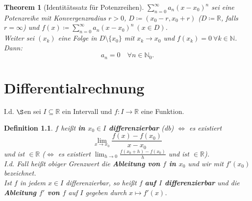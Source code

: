 \documentclass{extreport}
\newcommand{\N}{\mathbb{N}}
\newcommand{\R}{\mathbb{R}}
\theoremstyle{named}
\newtheorem{namedtheorem}{Theorem} \counterwithin{namedtheorem}{chapter}
\theoremstyle{dotless}
\newtheorem*{definition}{Definition}
\begin{document}
\begin{namedtheorem}[Identitätssatz für Potenzreihen] \label{8.4:prop-IdentitätssatzFürPotenzreihe}
	$\sum_{n=0}^{\infty} a_{n} (x - x_{0})^{n}$ sei eine Potenzreihe mit Konvergenzradius $r > 0$, $D \coloneqq (x_{0} - r, x_{0} + r)$ ($D \coloneqq \R$, falls $r = \infty$) und $f(x) \coloneqq \sum_{n=0}^{\infty} a_{n} (x - x_{0})^{n} ~(x \in D)$. \\
	Weiter sei $(x_{k})$ eine Folge in $D \setminus \{ x_{0} \}$ mit $x_{k} \rightarrow x_{0}$ und $f(x_{k}) = 0 ~\forall k \in \N$. Dann:
	$$ a_{n} = 0 \quad \forall n \in \N_{0}. $$ 
\end{namedtheorem}


\newpage


\chapter{Differentialrechnung}

I.d. $\S$en sei $I \subseteq \R$ ein Intervall und $f \colon I \rightarrow \R$ eine Funktion. 

 
\begin{definition}
	$f$ hei{\ss}t \textbf{in $x_{0} \in I$ differenzierbar} (db) $\iff$ es existiert
		$$\lim_{x \rightarrow x_{0}} \frac{f(x) - f(x_{0})}{x - x_{0}} $$
	und ist $\in \R$ ($\iff$ es existiert $\lim_{h \rightarrow 0} \frac{f(x_{0} + h) - f(x_{0})}{h}$ und ist $\in \R$). \\
	I.d. Fall hei{\ss}t obiger Grenzwert die \textbf{Ableitung von $f$ in $x_{0}$} und wir mit $f'(x_{0})$ bezeichnet. \\
	Ist $f$ in jedem $x \in I$ differenzierbar, so hei{\ss}t $f$ \textbf{auf $I$ differenzierbar} und die \textbf{Ableitung $f'$ von $f$} auf $I$ gegeben durch $x \mapsto f'(x)$.
\end{definition}
\end{document}
